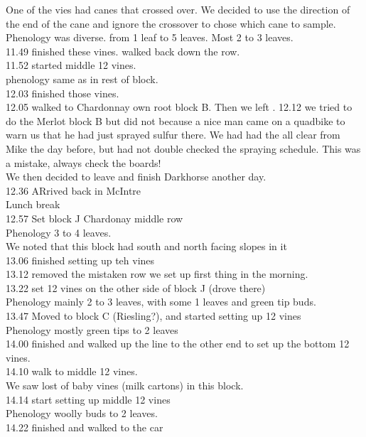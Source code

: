\documentclass[11pt,letter]{article}
\newenvironment{smitemize}{
\begin{itemize}
  \setlength{\itemsep}{0pt}
  \setlength{\parskip}{0.8pt}
  \setlength{\parsep}{0pt}}
{\end{itemize}
}
\begin{document}
\begin{smitemize}
One of the vies had canes that crossed over. We decided to use the direction of the end of the cane and ignore the crossover to chose which cane to sample. \\
Phenology was diverse. from 1 leaf to 5 leaves. Most 2 to 3 leaves. \\
11.49 finished these vines. walked back down the row. \\
11.52 started middle 12 vines. \\
phenology same as in rest of block. \\
12.03 finished those vines. \\
12.05 walked to Chardonnay own root block B. Then we left .
12.12 we tried to do the Merlot block B but did not because a nice man came on a quadbike to warn us that he had just sprayed sulfur there. We had had the all clear from Mike the day before, but had not double checked the spraying schedule. This was a mistake, always check the boards!\\
We then decided to leave and finish Darkhorse another day. \\
12.36 ARrived back in McIntre\\
Lunch break\\
12.57 Set block J Chardonay middle row \\
Phenology 3 to 4 leaves. \\
We noted that this block had south and north facing slopes in it \\
13.06 finished setting up teh vines \\
13.12 removed the mistaken row we set up first thing in the morning.\\
13.22 set 12 vines on the other side of block J (drove there)\\
Phenology mainly 2 to 3 leaves, with some 1 leaves and green tip buds. \\
13.47 Moved to block C (Riesling?), and started setting up 12 vines \\
Phenology mostly green tips to 2 leaves \\
14.00 finished and walked up the line to the other end to set up the bottom 12 vines. \\
14.10 walk to middle 12 vines. \\
We saw lost of baby vines (milk cartons) in this block. \\
14.14 start setting up middle 12 vines \\
Phenology woolly buds to 2 leaves. \\
14.22 finished and walked to the car\\

\end{smitemize}
\end{document}

